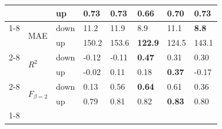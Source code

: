 \begin{table}
\begin{tabular}{llllllll}
 &  & up & \textbf{0.73} & 0.73 & 0.66 & 0.70 & 0.73 \\
\cline{1-8} \cline{2-8}
\multirow[t]{6}{*}{TransnetBW} & \multirow[t]{2}{*}{MAE} & down & 11.2 & 11.9 & 8.9 & 11.1 & \textbf{8.8} \\
 &  & up & 150.2 & 153.6 & \textbf{122.9} & 124.5 & 143.1 \\
\cline{2-8}
 & \multirow[t]{2}{*}{$R^2$} & down & -0.12 & -0.11 & \textbf{0.47} & 0.31 & 0.30 \\
 &  & up & -0.02 & 0.11 & 0.18 & \textbf{0.37} & -0.17 \\
\cline{2-8}
 & \multirow[t]{2}{*}{$F_{\beta=2}$} & down & 0.13 & 0.56 & \textbf{0.64} & 0.61 & 0.36 \\
 &  & up & 0.79 & 0.81 & 0.82 & \textbf{0.83} & 0.80 \\
\cline{1-8} \cline{2-8}
\bottomrule
\end{tabular}
\end{table}
